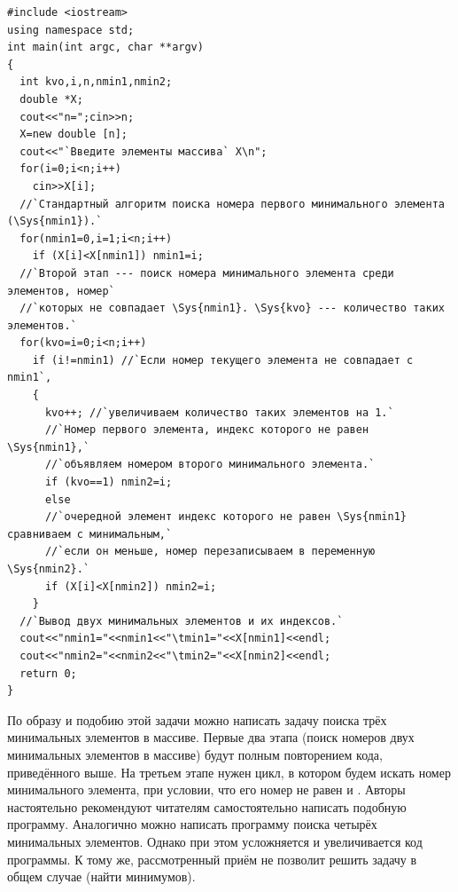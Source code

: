 \begin{lstlisting}
#include <iostream>
using namespace std;
int main(int argc, char **argv)
{
  int kvo,i,n,nmin1,nmin2;
  double *X;
  cout<<"n=";cin>>n;
  X=new double [n];
  cout<<"`Введите элементы массива` X\n";
  for(i=0;i<n;i++)
    cin>>X[i];
  //`Стандартный алгоритм поиска номера первого минимального элемента (\Sys{nmin1}).`
  for(nmin1=0,i=1;i<n;i++)
    if (X[i]<X[nmin1]) nmin1=i;
  //`Второй этап --- поиск номера минимального элемента среди элементов, номер` 
  //`которых не совпадает \Sys{nmin1}. \Sys{kvo} --- количество таких элементов.`
  for(kvo=i=0;i<n;i++)
    if (i!=nmin1) //`Если номер текущего элемента не совпадает с nmin1`, 
    {
      kvo++; //`увеличиваем количество таких элементов на 1.`
      //`Номер первого элемента, индекс которого не равен \Sys{nmin1},` 
      //`объявляем номером второго минимального элемента.`
      if (kvo==1) nmin2=i; 
      else
      //`очередной элемент индекс которого не равен \Sys{nmin1} сравниваем с минимальным,` 
      //`если он меньше, номер перезаписываем в переменную \Sys{nmin2}.`
      if (X[i]<X[nmin2]) nmin2=i;
    }
  //`Вывод двух минимальных элементов и их индексов.`
  cout<<"nmin1="<<nmin1<<"\tmin1="<<X[nmin1]<<endl;
  cout<<"nmin2="<<nmin2<<"\tmin2="<<X[nmin2]<<endl;
  return 0;
}
\end{lstlisting}


По образу и подобию этой задачи можно написать задачу поиска трёх минимальных элементов в массиве. Первые два этапа
(поиск номеров двух минимальных элементов в массиве) будут полным повторением кода, приведённого выше. На третьем этапе
нужен цикл, в котором будем искать номер минимального элемента, при условии, что его номер не равен
 и . Авторы настоятельно рекомендуют читателям самостоятельно написать
подобную программу. Аналогично можно написать программу поиска четырёх минимальных элементов. Однако при этом
усложняется и увеличивается код программы. К тому же, рассмотренный приём не позволит решить задачу в общем случае
(найти  минимумов). 

